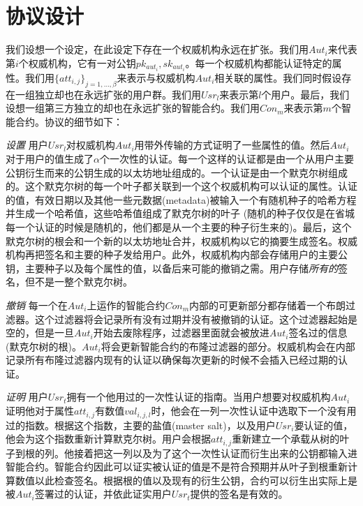 \documentclass[UTF8]{ctexart}
\begin{document}
\section{协议设计}
我们设想一个设定，在此设定下存在一个权威机构永远在扩张。我们用$Aut_i$来代表第$i$个权威机构，它有一对公钥$pk_{aut_i}, sk_{aut_i}$。每一个权威机构都能认证特定的属性。我们用$\{att_{i, j}\}_{j=1,\ldots,\beta}$来表示与权威机构$Aut_i$相关联的属性。我们同时假设存在一组独立却也在永远扩张的用户群。我们用$Usr_l$来表示第$l$个用户。最后，我们设想一组第三方独立的却也在永远扩张的智能合约。我们用$Con_m$来表示第$m$个智能合约。协议的细节如下：

\noindent \textit{设置} \hspace{0.1cm} 用户$Usr_l$对权威机构$Aut_i$用带外传输的方式证明了一些属性的值。然后$Aut_i$对于用户的值生成了$\alpha$个一次性的认证。每一个这样的认证都是由一个从用户主要公钥衍生而来的公钥生成的以太坊地址组成的。一个认证是由一个默克尔树组成的。这个默克尔树的每一个叶子都关联到一个这个权威机构可以认证的属性。认证的值，有效日期以及其他一些元数据(metadata)被输入一个有随机种子的哈希方程并生成一个哈希值，这些哈希值组成了默克尔树的叶子 (随机的种子仅仅是在省城每一个认证的时候是随机的，他们都是从一个主要的种子衍生来的)。最后，这个默克尔树的根会和一个新的以太坊地址合并，权威机构以它的摘要生成签名。权威机构再把签名和主要的种子发给用户。此外，权威机构内部会存储用户的主要公钥，主要种子以及每个属性的值，以备后来可能的撤销之需。用户存储\emph{所有的}签名，但不是一整个默克尔树。

\noindent \textit{撤销} \hspace{0.1cm} 每一个在$Aut_i$上运作的智能合约$Con_m$内部的可更新部分都存储着一个布朗过滤器。这个过滤器将会记录所有没有过期并没有被撤销的认证。这个过滤器起始是空的，但是一旦$Aut_i$开始去废除程序，过滤器里面就会被放进$Aut_i$签名过的信息(默克尔树的根)。$Aut_i$将会更新智能合约的布隆过滤器的部分。权威机构会在内部记录所有布隆过滤器内现有的认证以确保每次更新的时候不会插入已经过期的认证。

\noindent \textit{证明} \hspace{0.1cm} 用户$Usr_t$拥有一个他用过的一次性认证的指南。当用户想要对权威机构$Aut_i$证明他对于属性$att_{i, j}$有数值$val_{i, j, l}$时，他会在一列一次性认证中选取下一个没有用过的指数。根据这个指数，主要的盐值(master salt)，以及用户$Usr_i$要认证的值，他会为这个指数重新计算默克尔树。用户会根据$att_{i,j}$重新建立一个承载从树的叶子到根的列。他接着把这一列以及为了这个一次性认证而衍生出来的公钥都输入进智能合约。智能合约因此可以证实被认证的值是不是符合预期并从叶子到根重新计算数值以此检查签名。根据根的值以及现有的衍生公钥，合约可以衍生出实际上是被$Aut_i$签署过的认证，并依此证实用户$Usr_t$提供的签名是有效的。
\end{document}
